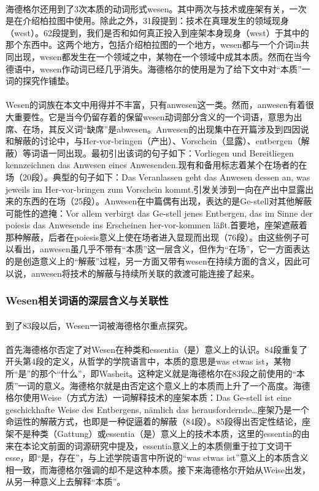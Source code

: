 \documentclass{article}
\begin{document}
			\paragraph{}
		海德格尔还用到了3次本质的动词形式wesen。其中两次与技术或座架有关，一次是在介绍柏拉图中使用。除此之外，31段提到：技术在真理发生的领域现身（west）。62段提到，我们是否和如何真正投入到座架本身现身（west）于其中的那个东西中。这两个地方，包括介绍柏拉图的一个地方，wesen都与一个介词in共同出现，wesen都发生在一个领域之中，某物在一个领域中成其本质。然而在当今德语中，wesen作动词已经几乎消失。海德格尔的使用是为了给下文中对“本质”一词的探究作铺垫。
			\paragraph{}
			Wesen的词族在本文中用得并不丰富，只有anwesen这一类。然而，anwesen有着很大重要性。它是当今仍留存着的保留wesen动词部分含义的一个词语，意思为出席、在场，其反义词“缺席”是abwesen。Anwesen的出现集中在开篇涉及到四因说和解蔽的讨论中，与Her-vor-bringen（产出）、Vorschein（显露）、entbergen（解蔽）等词语一同出现。最初引出该词的句子如下：Vorliegen und Bereitliegen kennzeichnen das Anwesen eines Anwesenden.现有和备用标志着某个在场者的在场（20段）。典型的句子如下：Das Veranlassen geht das Anwesen dessen an, was jeweils im Her-vor-bringen zum Vorschein kommt.引发关涉到一向在产出中显露出来的东西的在场（25段）。Anwesen在中篇偶有出现，表达的是Ge-stell对其他解蔽可能性的遮掩：Vor allem verbirgt das Ge-stell jenes Entbergen, das im Sinne der poiesis das Anwesende ins Erscheinen her-vor-kommen läßt.首要地，座架遮蔽着那种解蔽，后者在poiesis意义上使在场者进入显现而出现（76段）。由这些例子可以看出，anwesen虽几乎不带有“本质”这一层含义，但作为“在场”，它一方面表达的是创造意义上的“解蔽”过程，另一方面又带有wesen在持续方面的含义，因此可以说，anwesen将技术的解蔽与持续所关联的救渡可能连接了起来。
		\subsubsection{Wesen相关词语的深层含义与关联性}
			\paragraph{}
		到了83段以后，Wesen一词被海德格尔重点探究。
			\paragraph{}		
			首先海德格尔否定了对Wesen在种类和essentia（是）意义上的认识。84段重复了开头第4段的定义，从哲学的学院语言中，本质的意思是was etwas ist，某物所“是”的那个“什么”，即Washeit。这种定义就是海德格尔在83段之前使用的“本质”一词的意义。海德格尔就是由否定这个意义上的本质而上升了一个高度。海德格尔使用Weise（方式方法）一词解释技术的座架本质：Das Ge-stell ist eine geschickhafte Weise des Entbergens, nämlich das herausfordernde…座架乃是一个命运性的解蔽方式，也即是一种促逼着的解蔽（84段）。85段得出否定性结论，座架不是种类（Gattung）或essentia（是）意义上的技术本质，这里的essentia的由来在本论文前面的词源研究中提及，essentia意义上的本质侧重于拉丁文词干esse，即“是，存在”，与上述学院语言中所说的“was etwas ist”意义上的本质含义相一致，而海德格尔强调的却不是这种本质。接下来海德格尔开始从Weise出发，从另一种意义上去解释“本质”。
\end{document}
